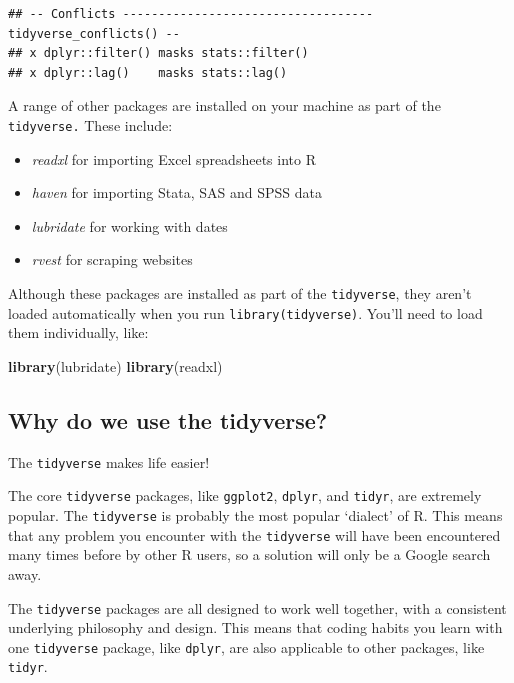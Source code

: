 \documentclass[]{book}
\newenvironment{Shaded}{\begin{snugshade}}{\end{snugshade}}
\newcommand{\KeywordTok}[1]{\textcolor[rgb]{0.13,0.29,0.53}{\textbf{#1}}}
\newcommand{\NormalTok}[1]{#1}
\providecommand{\tightlist}{%
  \setlength{\itemsep}{0pt}\setlength{\parskip}{0pt}}
\begin{document}
\begin{verbatim}
## -- Conflicts ----------------------------------- tidyverse_conflicts() --
## x dplyr::filter() masks stats::filter()
## x dplyr::lag()    masks stats::lag()
\end{verbatim}

A range of other packages are installed on your machine as part of the \texttt{tidyverse.} These include:

\begin{itemize}
\tightlist
\item
  \emph{readxl} for importing Excel spreadsheets into R
\item
  \emph{haven} for importing Stata, SAS and SPSS data
\item
  \emph{lubridate} for working with dates
\item
  \emph{rvest} for scraping websites
\end{itemize}

Although these packages are installed as part of the \texttt{tidyverse}, they aren't loaded automatically when you run \texttt{library(tidyverse)}. You'll need to load them individually, like:

\begin{Shaded}
\begin{Highlighting}[]
\KeywordTok{library}\NormalTok{(lubridate)}
\KeywordTok{library}\NormalTok{(readxl)}
\end{Highlighting}
\end{Shaded}

\hypertarget{why-do-we-use-the-tidyverse}{%
\subsection{Why do we use the tidyverse?}\label{why-do-we-use-the-tidyverse}}

The \texttt{tidyverse} makes life easier!

The core \texttt{tidyverse} packages, like \texttt{ggplot2}, \texttt{dplyr}, and \texttt{tidyr}, are extremely popular. The \texttt{tidyverse} is probably the most popular `dialect' of R. This means that any problem you encounter with the \texttt{tidyverse} will have been encountered many times before by other R users, so a solution will only be a Google search away.

The \texttt{tidyverse} packages are all designed to work well together, with a consistent underlying philosophy and design. This means that coding habits you learn with one \texttt{tidyverse} package, like \texttt{dplyr}, are also applicable to other packages, like \texttt{tidyr}.
\end{document}
